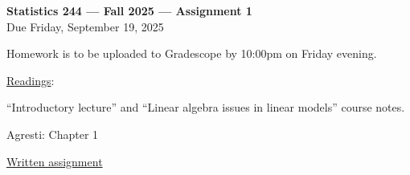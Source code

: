 
\pagestyle{empty}
\usepackage{tcolorbox}
\usepackage{mathrsfs}
\usepackage{bm}



\begin{center}
{\large\bf Statistics 244 --- Fall 2025 --- Assignment 1}\\
Due
Friday, 
September 19, 2025
\end{center}

Homework is to be 
uploaded to Gradescope by 10:00pm on Friday evening.

\underline{Readings}:

``Introductory lecture''  and
``Linear algebra issues in linear models'' 
course notes.

Agresti:  Chapter 1 

\underline{Written assignment}

